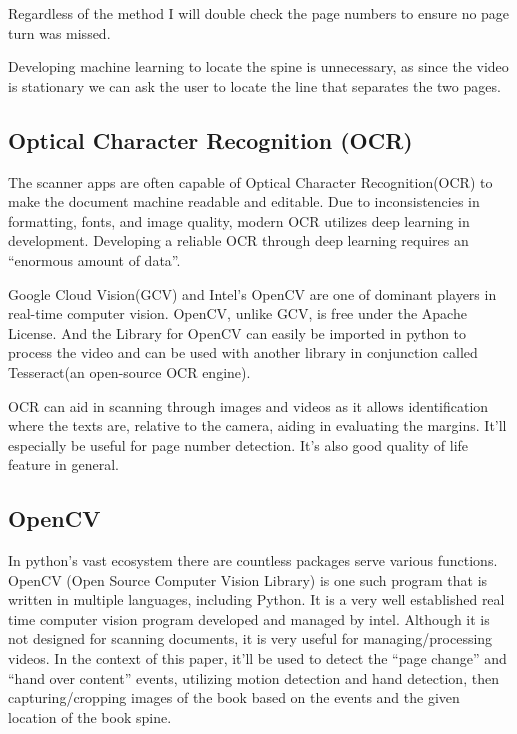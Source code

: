 \documentclass[10pt,twocolumn]{article}
\begin{document}
Regardless of the method I will double check the page numbers to ensure no page turn was missed.\newline

Developing machine learning to locate the spine is unnecessary, as since the video is stationary we can ask the user to locate the line that separates the two pages.\newline

\subsection{Optical Character Recognition (OCR)}

The scanner apps are often capable of Optical Character Recognition(OCR) to make the document machine readable and editable. Due to inconsistencies in formatting, fonts, and image quality, modern OCR utilizes deep learning in development\cite{hukkeri2022}. Developing a reliable OCR through deep learning requires an “enormous amount of data”\cite{hukkeri2022}.\newline

Google Cloud Vision(GCV) and Intel's OpenCV are one of dominant players in real-time computer vision. OpenCV, unlike GCV, is free under the Apache License. And the Library for OpenCV can easily be imported in python to process the video and can be used with another library in conjunction called Tesseract(an open-source OCR engine).\newline

OCR can aid in scanning through images and videos as it allows identification where the texts are, relative to the camera, aiding in evaluating the margins\cite{avyodri2022}. It’ll especially be useful for page number detection. It's also good quality of life feature in general.\newline

\subsection{OpenCV}
In python's vast ecosystem there are countless packages serve various functions. OpenCV (Open Source Computer Vision Library) is one such program that is written in multiple languages, including Python. It is a very well established real time computer vision program developed and managed by intel. Although it is not designed for scanning documents, it is very useful for managing/processing videos. In the context of this paper, it'll be used to detect the “page change” and “hand over content” events\cite{wigington2024}, utilizing motion detection and hand detection, then capturing/cropping images of the book based on the events and the given location of the book spine.\newline
\end{document}
